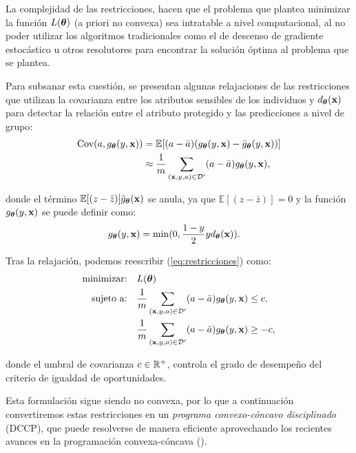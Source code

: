\documentclass[oneside,openright,titlepage,numbers=noenddot,openany,headinclude,footinclude=true,
cleardoublepage=empty,abstractoff,BCOR=5mm,paper=a4,fontsize=12pt,main=spanish]{scrreprt}
\begin{document}
La complejidad de las restricciones, hacen que el problema que plantea minimizar la función $L(\bm{\theta})$ (a priori no convexa) sea intratable a nivel computacional, al no poder utilizar los algoritmos tradicionales como el de descenso de gradiente estocástico u otros resolutores para encontrar la solución óptima al problema que se plantea. 

Para subsanar esta cuestión, se presentan algunas relajaciones de las restricciones que utilizan la covarianza entre los atributos sensibles de los individuos y $d_{\bm{\theta}}(\textbf{x})$ para detectar la relación entre el atributo protegido y las predicciones a nivel de grupo:
\begin{equation*}
\begin{split}
\text{Cov}(a,g_{\bm{\theta}}(y,\textbf{x}))&=\mathbb{E}[(a-\bar{a})(g_{\bm{\theta}}(y,\textbf{x})-\bar{g}_{\bm{\theta}}(y,\textbf{x}))]\\
&\approx \frac{1}{m} \sum_{(\textbf{x},y,a)\in \mathcal{D}'}(a-\bar{a})g_{\bm{\theta}}(y,\textbf{x}),
\end{split}
\end{equation*}

donde el término $\mathbb{E}[(z-\bar{z})]\bar{g}_{\bm{\theta}}(\textbf{x})$ se anula, ya que $\mathbb{E}[(z-\bar{z})]=0$ y la función $g_{\bm{\theta}}(y,\textbf{x})$ se puede definir como:
\begin{equation*}
\begin{split}
g_{\bm{\theta}}(y,\textbf{x})&=\min (0,\frac{1-y}{2} y d_{\bm{\theta}} (\textbf{x})).
\end{split}
\end{equation*}

Tras la relajación, podemos reescribir (\ref{eq:restricciones}) como:
\begin{equation}\label{eq:restricciones2}
\begin{split}
\text{minimizar:} &\quad L(\bm{\theta})\\
\text{sujeto a:} &\quad \frac{1}{m} \sum_{(\textbf{x},y,a)\in \mathcal D'} (a-\bar{a})g_{\bm{\theta}}(y,\textbf{x}) \leq c,\\
&\quad \frac{1}{m} \sum_{(\textbf{x},y,a)\in \mathcal D'} (a-\bar{a})g_{\bm{\theta}}(y,\textbf{x})  \geq -c,
\end{split}
\end{equation}

donde el umbral de covarianza $c \in \mathbb{R}^+$, controla el grado de desempeño del criterio de igualdad de oportunidades.

Esta formulación sigue siendo no convexa, por lo que a continuación convertiremos estas restricciones en un \textit{programa convexo-cóncavo disciplinado} (DCCP), que puede resolverse de manera eficiente aprovechando los recientes avances en la programación convexa-cóncava (\cite{convex2016}).
\end{document}
